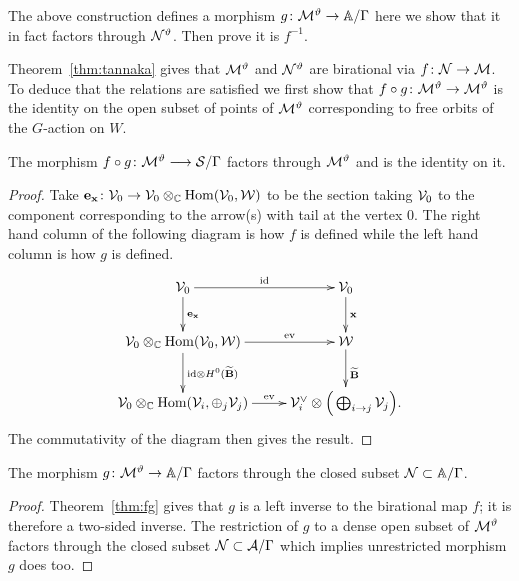 \documentclass{amsart}
\theoremstyle{definition}
\begin{document}
The above construction defines a morphism $g \colon \mathcal{M}^\vartheta \rightarrow \mathbb{A}/\Gamma$ here we show that it in fact factors through $\mathcal{N}^\vartheta$.
Then prove it is $f^{-1}$.

Theorem~\ref{thm:tannaka} gives that $\mathcal{M}^\vartheta$ and $\mathcal{N}^\vartheta$ are birational via $f \colon \mathcal{N} \rightarrow \mathcal{M}$.
To deduce that the relations are satisfied we first show that $f \circ g \colon \mathcal{M}^\vartheta \rightarrow \mathcal{M}^\vartheta$ is the identity on the open subset of points of $\mathcal{M}^\vartheta$ corresponding to free orbits of the $G$-action on $W$.

\begin{theorem}\label{thm:fg}
The morphism $f \circ g \colon \mathcal{M}^{\vartheta} \longrightarrow \mathcal{S}/\Gamma$ factors through $\mathcal{M}^\vartheta$ and is the identity on it.
\end{theorem}

\begin{proof}
Take $\mathbf{e}_{\mathbf{x}} \colon \mathcal{V}_0 \rightarrow \mathcal{V}_0 \otimes_{\mathbb{C}} \operatorname{Hom}(\mathcal{V}_0, \mathcal{W})$ to be the section taking $\mathcal{V}_0$ to the component corresponding to the arrow(s) with tail at the vertex $0$.
The right hand column of the following diagram is how $f$ is defined while the left hand column is how $g$ is defined.
\begin{equation}\label{eq:gf}
    \xymatrix{\cV_0 \ar[r]^{\text{id}} \ar[d]^{\bfe_\bfx} & \cV_0 \ar[d]^\bfx \\
    \cV_0 \otimes_\bC \Hom(\cV_0, \cW) \ar[r]^-{\text{ev}} \ar[d]^{\text{id} \otimes H^0({\widetilde{\bfB}})} & \cW \ar[d]^{\widetilde{\bfB}} \\
    \cV_0 \otimes_\bC \Hom(\cV_i, \oplus_j \cV_j) \ar[r]^-{\text{ev}} & \cV_i^\vee \otimes \Big(\bigoplus_{i \rightarrow j}\cV_j\Big).
    }
\end{equation}
The commutativity of the diagram then gives the result.
\end{proof}

\begin{corollary}
The morphism $g \colon \mathcal{M}^\vartheta \rightarrow \mathbb{A}/\Gamma$ factors through the closed subset $\mathcal{N} \subset \mathbb{A}/\Gamma$.
\end{corollary}

\begin{proof}
Theorem~\ref{thm:fg} gives that $g$ is a left inverse to the birational map $f$; it is therefore a two-sided inverse.
The restriction of $g$ to a dense open subset of $\mathcal{M}^\vartheta$ factors through the closed subset $\mathcal{N} \subset \mathcal{A}/\Gamma$ which implies unrestricted morphism $g$ does too.
\end{proof}
\end{document}
